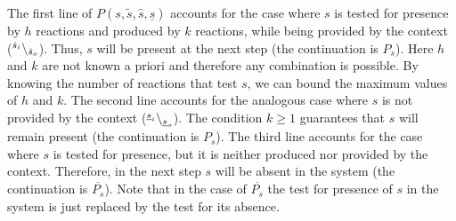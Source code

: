 The first line of $ P(s,\tilde{s},\hat{s},\underline{s})$ accounts for the case where $s$ is tested for presence by $h$ reactions and produced by $k$ reactions, while being provided by the context (${}^{\hat{s}_i} \backslash_{\hat{s}_o}$).
Thus, $s$ will be present at the next step (the continuation is $P_s$). Here $h$ and $k$ are not known a priori and therefore any
combination is possible. By knowing the number of reactions that test $s$, we can bound the maximum 
values of $h$ and $k$.
The second line accounts for the analogous case where $s$ is not provided by the context (${}^{\underline{s}_i} \backslash_{\underline{s}_o}$). 
The condition $k\geq 1$ guarantees that $s$ will remain present (the continuation is $P_s$).
The third line accounts for the case where $s$ is tested for presence, but it is neither produced nor provided by  the context. Therefore, in the next step $s$ will be absent in the system (the continuation is $\overline{P_s}$).
Note that in the case of $\overline{P_s}$ the test for presence of $s$ in the system is just replaced by the test for its absence.

